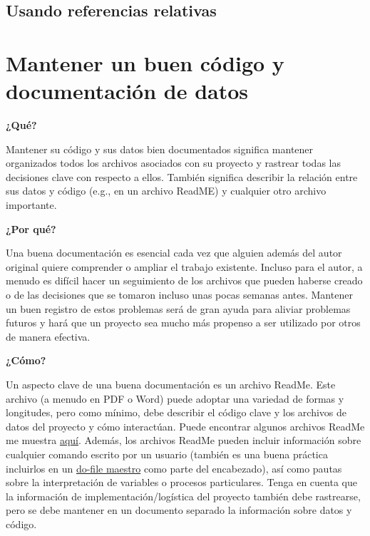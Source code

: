\documentclass[11pt,en]{elegantpaper}
\begin{document}
\subsection{Usando referencias relativas}
\label{sec:refrelativas}

\newpage 
\section{Mantener un buen código y documentación de datos}
\label{sec:documentacion}
\noindent
\textbf{¿Qué?}

Mantener su código y sus datos bien documentados significa mantener organizados todos los archivos asociados con su proyecto y rastrear todas las decisiones clave con respecto a ellos. También significa describir la relación entre sus datos y código (e.g., en un archivo ReadME) y cualquier otro archivo importante.

\noindent
\textbf{¿Por qué?}

Una buena documentación es esencial cada vez que alguien además del autor original quiere comprender o ampliar el trabajo existente. Incluso para el autor, a menudo es difícil hacer un seguimiento de los archivos que pueden haberse creado o de las decisiones que se tomaron incluso unas pocas semanas antes. Mantener un buen registro de estos problemas será de gran ayuda para aliviar problemas futuros y hará que un proyecto sea mucho más propenso a ser utilizado por otros de manera efectiva.

\noindent
\textbf{¿Cómo?}

Un aspecto clave de una buena documentación es un archivo ReadMe. Este archivo (a menudo en PDF o Word) puede adoptar una variedad de formas y longitudes, pero como mínimo, debe describir el código clave y los archivos de datos del proyecto y cómo interactúan. Puede encontrar algunos archivos ReadMe me muestra \href{http://www.poverty-action.org/research-transparency/example-readme-files}{aquí}. Además, los archivos ReadMe pueden incluir información sobre cualquier comando escrito por un usuario (también es una buena práctica incluirlos en un \href{http://www.poverty-action.org/research-transparency/example-master}{do-file maestro} como parte del encabezado), así como pautas sobre la interpretación de variables o procesos particulares. Tenga en cuenta que la información de implementación/logística del proyecto también debe rastrearse, pero se debe mantener en un documento separado la información sobre datos y código.
\end{document}
